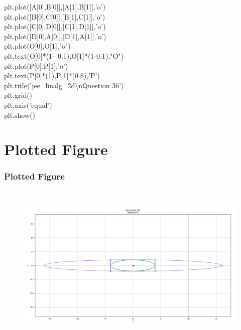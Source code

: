 \documentclass{beamer}
\theoremstyle{remark}
\numberwithin{equation}{section}
\begin{document}
\begin{frame}
plt.plot([A[0],B[0]],[A[1],B[1]],'o')\\
plt.plot([B[0],C[0]],[B[1],C[1]],'o')\\
plt.plot([C[0],D[0]],[C[1],D[1]],'o')\\
plt.plot([D[0],A[0]],[D[1],A[1]],'o')\\
\vspace{10pt}
plt.plot(O[0],O[1],"o")\\
plt.text(O[0]*(1+0.1),O[1]*(1-0.1),"O")\\
\vspace{10pt}
plt.plot(P[0],P[1],'o')\\
plt.text(P[0]*(1),P[1]*(0.8),'P')\\
\vspace{10pt}
plt.title('jee\_linalg\_2d\textbackslash nQuestion 36')\\
plt.grid()\\
plt.axis('equal')\\
plt.show()\\
\end{frame}
\section{Plotted Figure}
\begin{frame}[fragile]
\frametitle{Plotted Figure}
\begin{figure}
\includegraphics[width=12cm,height=8cm]{./figs/Ellipse2.png}
\end{figure}
\end{frame}
%
%  
%
%
\end{document}

